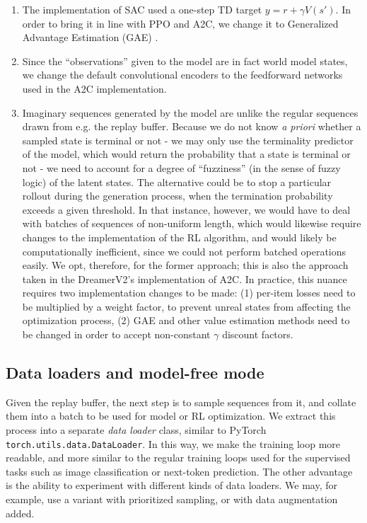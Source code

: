 \documentclass[en]{pracamgr}
\begin{document}
\begin{enumerate}
  \item The implementation of SAC used a one-step TD target $y = r + \gamma V(s')$. In order to bring it in line with PPO and A2C, we change it to Generalized Advantage Estimation (GAE) \autocite{schulmanHighDimensionalContinuousControl2018}.
  \item Since the ``observations'' given to the model are in fact world model states, we change the default convolutional encoders to the feedforward networks used in the A2C implementation.
  \item Imaginary sequences generated by the model are unlike the regular sequences drawn from e.g. the replay buffer. Because we do not know \emph{a priori} whether a sampled state is terminal or not - we may only use the terminality predictor of the model, which would return the probability that a state is terminal or not - we need to account for a degree of ``fuzziness'' (in the sense of fuzzy logic) of the latent states. The alternative could be to stop a particular rollout during the generation process, when the termination probability exceeds a given threshold. In that instance, however, we would have to deal with batches of sequences of non-uniform length, which would likewise require changes to the implementation of the RL algorithm, and would likely be computationally inefficient, since we could not perform batched operations easily. We opt, therefore, for the former approach; this is also the approach taken in the DreamerV2's implementation of A2C. In practice, this nuance requires two implementation changes to be made: (1) per-item losses need to be multiplied by a weight factor, to prevent unreal states from affecting the optimization process, (2) GAE and other value estimation methods need to be changed in order to accept non-constant $\gamma$ discount factors.
\end{enumerate}

\subsection{Data loaders and model-free mode}

Given the replay buffer, the next step is to sample sequences from it, and collate them into a batch to be used for model or RL optimization. We extract this process into a separate \emph{data loader} class, similar to PyTorch {\tt torch.utils.data.DataLoader}. In this way, we make the training loop more readable, and more similar to the regular training loops used for the supervised tasks such as image classification or next-token prediction. The other advantage is the ability to experiment with different kinds of data loaders. We may, for example, use a variant with prioritized sampling, or with data augmentation added.
\end{document}
